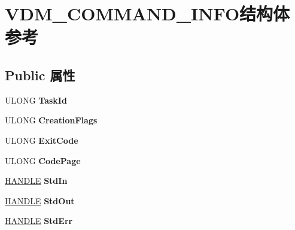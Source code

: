 \hypertarget{struct_v_d_m___c_o_m_m_a_n_d___i_n_f_o}{}\section{V\+D\+M\+\_\+\+C\+O\+M\+M\+A\+N\+D\+\_\+\+I\+N\+F\+O结构体 参考}
\label{struct_v_d_m___c_o_m_m_a_n_d___i_n_f_o}
\subsection*{Public 属性}
\begin{DoxyCompactItemize}
\item 
\mbox{\label{struct_v_d_m___c_o_m_m_a_n_d___i_n_f_o_ac3e4ceb5e5773790dd2f4df0d3c7ec9d}} 
U\+L\+O\+NG {\bfseries Task\+Id}
\item 
\mbox{\label{struct_v_d_m___c_o_m_m_a_n_d___i_n_f_o_aed527a6fb8d774d294f5cb353a9f1480}} 
U\+L\+O\+NG {\bfseries Creation\+Flags}
\item 
\mbox{\label{struct_v_d_m___c_o_m_m_a_n_d___i_n_f_o_af78982c4ba5178b93a9fbfc72076a977}} 
U\+L\+O\+NG {\bfseries Exit\+Code}
\item 
\mbox{\label{struct_v_d_m___c_o_m_m_a_n_d___i_n_f_o_a8ce28762e089eb8dd34fae497ca369d2}} 
U\+L\+O\+NG {\bfseries Code\+Page}
\item 
\mbox{\label{struct_v_d_m___c_o_m_m_a_n_d___i_n_f_o_a663d473acccbd16093f73e980adfa5d5}} 
\hyperlink{interfacevoid}{H\+A\+N\+D\+LE} {\bfseries Std\+In}
\item 
\mbox{\label{struct_v_d_m___c_o_m_m_a_n_d___i_n_f_o_a1f0f3c3075580cf9fe82ac8d834c44e8}} 
\hyperlink{interfacevoid}{H\+A\+N\+D\+LE} {\bfseries Std\+Out}
\item 
\mbox{\label{struct_v_d_m___c_o_m_m_a_n_d___i_n_f_o_ad626ff537216fce5f39b9ca2b5ea0ccb}} 
\hyperlink{interfacevoid}{H\+A\+N\+D\+LE} {\bfseries Std\+Err}
\item 

\end{DoxyCompactItemize}
